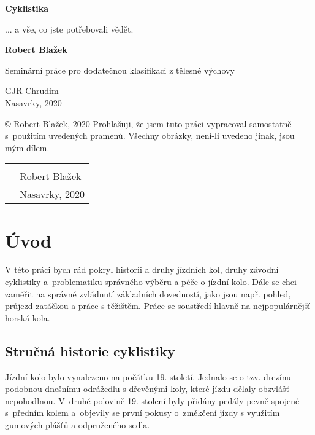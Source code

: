 \documentclass[11pt]{article}
\begin{document}
\begin{titlepage}
    \begin{center}
        \vspace*{1cm}

        \Huge
        \textbf{{Cyklistika}}

        \vspace{0.5cm}
        ... a vše, co jste potřebovali vědět.

        \vspace{1.5cm}

        \large
        \textbf{Robert Blažek}
        
        \vfill

        Seminární práce pro dodatečnou klasifikaci z tělesné výchovy

        \vspace{0.8cm}
        GJR Chrudim\\
        Nasavrky, 2020
    \end{center}
\end{titlepage}

\vspace*{\fill}
\noindent © Robert Blažek, 2020
\newline \newline
Prohlašuji, že jsem tuto práci vypracoval samostatně s~použitím uvedených pramenů. \newline Všechny obrázky, není-li uvedeno jinak, jsou mým dílem.
\newline \newline \newline \newline 
\begin{tabular}{@{}p{0in}p{4in}@{}}
    & \hrulefill \\
    & Robert Blažek \\
    & Nasavrky, 2020\\
    \end{tabular}
\newpage
\tableofcontents
\newpage

\section{Úvod}
V této práci bych rád pokryl historii a druhy jízdních kol, druhy závodní cyklistiky a~problematiku správného výběru a péče o jízdní kolo. Dále se chci zaměřit na správné zvládnutí základních dovedností, jako jsou např. pohled, průjezd zatáčkou a práce s těžištěm. Práce se soustředí hlavně na nejpopulárnější horská kola.
\subsection[Stručná historie]{Stručná historie cyklistiky}
Jízdní kolo bylo vynalezeno na počátku 19. století. Jednalo se o tzv. drezínu podobnou dnešnímu odrážedlu s dřevěnými koly, které jízdu dělaly obzvlášť nepohodlnou. V~druhé polovině 19. stolení byly přidány pedály pevně spojené s~předním kolem a~objevily se první pokusy o~změkčení jízdy s využitím gumových plášťů a odpruženého sedla.\cite{kolowiki}
\end{document}

